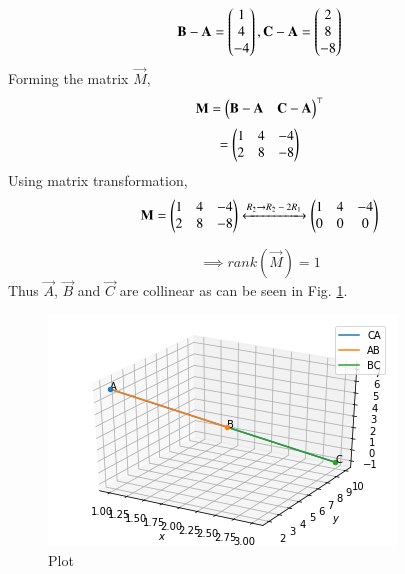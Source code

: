 \begin{equation}
    \vec{B} - \vec{A} = \myvec{1\\4\\-4}, \vec{C} - \vec{A} = \myvec{2\\8\\-8}
\end{equation}
Forming the matrix $\vec{M}$,
\begin{align}
    \vec{M}=\myvec{\vec{B} - \vec{A} & \vec{C} - \vec{A}}^\top
\end{align}
\begin{align}
=\myvec{1 &4 &-4\\2 &8 &-8}
\end{align}
Using matrix transformation,
\begin{align}
 \vec{M} = \begin{pmatrix}
    1 & 4 & -4\\
    2 & 8 & -8
    \end{pmatrix} \xleftrightarrow{\text{$R_2$}\rightarrow{\text{$R_2 - {2} R_1$ }}}
 \begin{pmatrix}
 1 & 4 & -4\\
 0 & 0 & 0
 \end{pmatrix}
\end{align}
 
\begin{equation}
   \implies rank(\vec{M}) = 1 
\end{equation}
Thus $\vec{A}$, $\vec{B}$ and $\vec{C}$ are collinear as can be seen in Fig. \ref{aug/2/12/plot}.

 
\begin{figure}[!ht]
    \centering 
         \includegraphics[width=\columnwidth]{solutions/aug/2/12/Figure.png}
         \caption{Plot}
         \label{aug/2/12/plot}
\end{figure}
